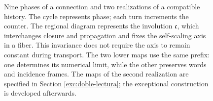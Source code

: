 \begin{figure}[!htbp]
\caption{\fontsize{9}{11}\selectfont Nine phases of a connection and two realizations of a compatible
history. The cycle represents phase; each turn increments the counter.
The regional diagram represents the involution \(\mathfrak c\), which
interchanges closure and propagation and fixes the self-scaling axis in a fiber.
This invariance does not require the axis to remain constant during transport.
The two lower maps use the same prefix: one determines its numerical limit,
while the other preserves words and incidence frames. The maps of the second
realization are specified in Section \ref{exc:doble-lectura}; the exceptional
construction is developed afterwards.}
\label{mono-ampl:fig-regional}
\end{figure}
